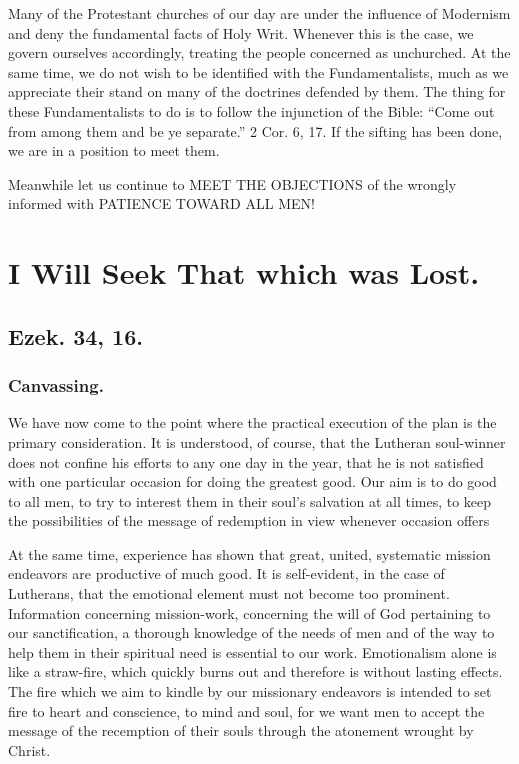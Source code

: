 \documentclass[
]{book}
\begin{document}
Many of the Protestant churches of our day are under the influence of Modernism and deny the fundamental facts of Holy Writ. Whenever this is the case, we govern ourselves accordingly, treating the people concerned as unchurched. At the same time, we do not wish to be identified with the Fundamentalists, much as we appreciate their stand on many of the doctrines defended by them. The thing for these Fundamentalists to do is to follow the injunction of the Bible: ``Come out from among them and be ye separate.'' 2 Cor. 6, 17. If the sifting has been done, we are in a position to meet them.

Meanwhile let us continue to MEET THE OBJECTIONS of the wrongly informed with PATIENCE TOWARD ALL MEN!

\hypertarget{i-will-seek-that-which-was-lost.}{%
\chapter{I Will Seek That which was Lost.}\label{i-will-seek-that-which-was-lost.}}

\hypertarget{ezek.-34-16.}{%
\section*{Ezek. 34, 16.}\label{ezek.-34-16.}}

\hypertarget{canvassing.}{%
\subsection*{Canvassing.}\label{canvassing.}}

We have now come to the point where the practical execution of the plan is the primary consideration. It is understood, of course, that the Lutheran soul-winner does not confine his efforts to any one day in the year, that he is not satisfied with one particular occasion for doing the greatest good. Our aim is to do good to all men, to try to interest them in their soul's salvation at all times, to keep the possibilities of the message of redemption in view whenever occasion offers

At the same time, experience has shown that great, united, systematic mission endeavors are productive of much good. It is self-evident, in the case of Lutherans, that the emotional element must not become too prominent. Information concerning mission-work, concerning the will of God pertaining to our sanctification, a thorough knowledge of the needs of men and of the way to help them in their spiritual need is essential to our work. Emotionalism alone is like a straw-fire, which quickly burns out and therefore is without lasting effects. The fire which we aim to kindle by our missionary endeavors is intended to set fire to heart and conscience, to mind and soul, for we want men to accept the message of the recemption of their souls through the atonement wrought by Christ.
\end{document}
